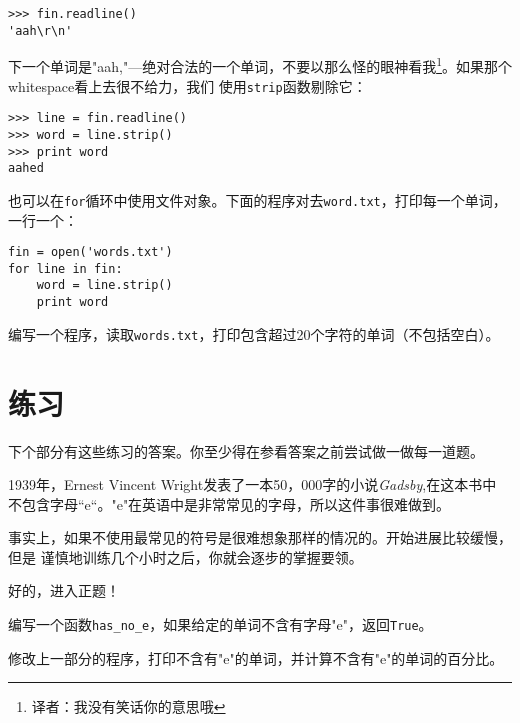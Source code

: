 \beforeverb
\begin{verbatim}
>>> fin.readline()
'aah\r\n'
\end{verbatim}
\afterverb

下一个单词是"aah,"---绝对合法的一个单词，不要以那么怪的眼神看我\footnote{译者：我没有笑话你的意思哦}。如果那个whitespace看上去很不给力，我们
使用{\tt strip}函数剔除它：


\beforeverb
\begin{verbatim}
>>> line = fin.readline()
>>> word = line.strip()
>>> print word
aahed
\end{verbatim}
\afterverb

也可以在{\tt for}循环中使用文件对象。下面的程序对去{\tt word.txt}，打印每一个单词，一行一个：


\beforeverb
\begin{verbatim}
fin = open('words.txt')
for line in fin:
    word = line.strip()
    print word
\end{verbatim}
\afterverb

\begin{ex}
编写一个程序，读取{\tt words.txt}，打印包含超过20个字符的单词（不包括空白）。


\end{ex}

\section{练习}

下个部分有这些练习的答案。你至少得在参看答案之前尝试做一做每一道题。

\begin{ex}

1939年，Ernest Vincent Wright发表了一本50，000字的小说{\em Gadsby},在这本书中
不包含字母“e“。"e"在英语中是非常常见的字母，所以这件事很难做到。

事实上，如果不使用最常见的符号是很难想象那样的情况的。开始进展比较缓慢，但是
谨慎地训练几个小时之后，你就会逐步的掌握要领。

好的，进入正题！

编写一个函数\verb"has_no_e"，如果给定的单词不含有字母"e"，返回{\tt True}。

修改上一部分的程序，打印不含有"e"的单词，并计算不含有"e"的单词的百分比。


\end{ex}

